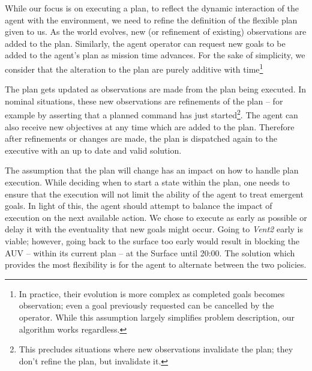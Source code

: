  
While our focus is on executing a plan, to reflect the dynamic
interaction of the agent with the environment, we need to refine the
definition of the flexible plan given to us. As the world
evolves, new (or refinement of existing) observations are added to
the plan. Similarly, the agent operator can request new goals
to be added to the agent's plan as mission time
advances. For the sake of simplicity, we consider that the alteration
to the plan are purely additive with time\footnote{In practice, their
  evolution is more complex as completed goals becomes observation;
  even a goal previously requested can be cancelled by the
  operator. While this assumption largely simplifies problem
  description, our algorithm works regardless.}
%

The plan gets updated as observations are made from the plan
being executed. In nominal situations, these new observations
are refinements of the plan -- for example by asserting that a planned
command has just started\footnote{This precludes situations where new
  observations invalidate the plan; they don't refine the plan, but
  invalidate it.}. The agent can also receive new objectives at any
time which are added to the plan. Therefore after refinements or changes are made,
the plan is dispatched again to the executive with an up to date and valid solution. 

The assumption that the plan will change has an impact on how to handle plan
execution. While deciding when to start a state within the plan, one
needs to ensure that the execution will not limit the ability of the
agent to treat emergent goals. In light of this, the agent should
attempt to balance the impact of execution on the next available action. We chose to execute
as early as possible or delay it with the eventuality that new goals
might occur. Going to \emph{Vent2} early is viable; however, going
back to the surface too early would result in blocking the AUV --
within its current plan -- at the Surface until 20:00. The solution
which provides the most flexibility is for the agent to alternate
between the two policies.

